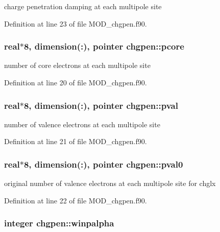 charge penetration damping at each multipole site 



Definition at line 23 of file M\-O\-D\-\_\-chgpen.\-f90.

\hypertarget{classchgpen_a27ad91c13fa6216be0b9a9bff32c37b4}{
\subsubsection[{pcore}]{\setlength{\rightskip}{0pt plus 5cm}real$\ast$8, dimension(\-:), pointer chgpen\-::pcore}}\label{classchgpen_a27ad91c13fa6216be0b9a9bff32c37b4}


number of core electrons at each multipole site 



Definition at line 20 of file M\-O\-D\-\_\-chgpen.\-f90.

\hypertarget{classchgpen_a45f461ef1ab04e18781d0ef0b8e968be}{
\subsubsection[{pval}]{\setlength{\rightskip}{0pt plus 5cm}real$\ast$8, dimension(\-:), pointer chgpen\-::pval}}\label{classchgpen_a45f461ef1ab04e18781d0ef0b8e968be}


number of valence electrons at each multipole site 



Definition at line 21 of file M\-O\-D\-\_\-chgpen.\-f90.

\hypertarget{classchgpen_a1f5eb04050c62935ac8869e880b99698}{
\subsubsection[{pval0}]{\setlength{\rightskip}{0pt plus 5cm}real$\ast$8, dimension(\-:), pointer chgpen\-::pval0}}\label{classchgpen_a1f5eb04050c62935ac8869e880b99698}


original number of valence electrons at each multipole site for chglx 



Definition at line 22 of file M\-O\-D\-\_\-chgpen.\-f90.

\hypertarget{classchgpen_a84715553590bfaa7106de2d9824cd148}{
\subsubsection[{winpalpha}]{\setlength{\rightskip}{0pt plus 5cm}integer chgpen\-::winpalpha}}\label{classchgpen_a84715553590bfaa7106de2d9824cd148}


